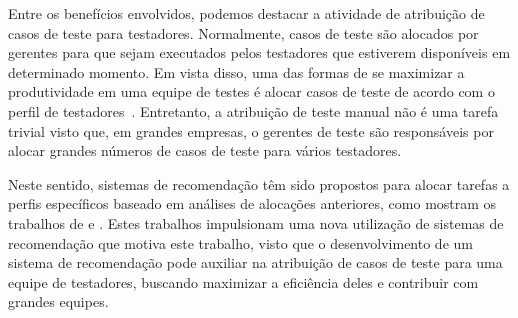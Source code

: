 Entre os benefícios envolvidos, podemos destacar a atividade de atribuição de casos de teste para testadores.
Normalmente, casos de teste são alocados por gerentes para que sejam executados pelos testadores que estiverem disponíveis em determinado momento. Em vista disso, uma das formas de se maximizar a produtividade em uma equipe de testes é alocar casos de teste de acordo com o perfil de testadores~\cite{miranda2012recommender}. Entretanto, a atribuição de teste manual não é uma tarefa trivial visto que,
em grandes empresas, o gerentes de teste são responsáveis por alocar grandes números de casos de teste para vários testadores.

Neste sentido, sistemas de recomendação têm sido propostos para alocar tarefas a perfis específicos baseado em análises de alocações anteriores, 
como mostram os trabalhos de \cite{anvik2006should} e \cite{miranda2012recommender}. Estes trabalhos impulsionam uma nova utilização de sistemas de recomendação que motiva este trabalho, visto que o desenvolvimento de um sistema de recomendação pode auxiliar na atribuição de casos de teste para uma equipe de testadores, buscando maximizar a eficiência deles e contribuir com grandes equipes.
















